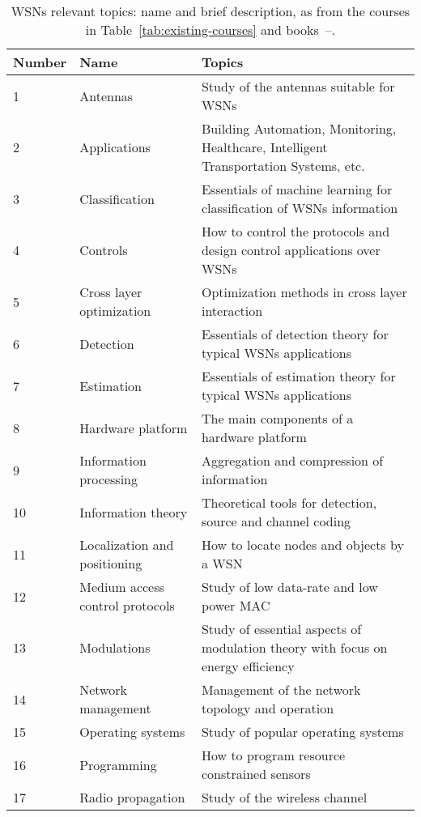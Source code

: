 \documentclass[onecolumn,12pt,draftclsnofoot,a4paper,peerreview]{IEEEtran}
\begin{document}
\begin{table}[t]
\tiny
\begin{center}
\caption{WSNs relevant topics: name and brief description, as from the courses in Table~\ref{tab:existing-courses} and books~\cite{ZhaoGuibas04}--\cite{WagnerWattenhofer10}.}
  \begin{tabular}{||  l || l  || l  ||  }
   \hline Number & Name & Topics \\
   \hline
    \hline 1 & Antennas & Study of the antennas suitable for WSNs \\
    \hline 2 & Applications  &  Building Automation, Monitoring, Healthcare, Intelligent Transportation Systems, etc. \\
    \hline 3 & Classification & Essentials of machine learning for classification of WSNs information \\
    \hline 4 & Controls  & How to control the protocols and design control applications over WSNs\\
    \hline 5 & Cross layer optimization & Optimization methods in cross layer interaction \\
    \hline 6 & Detection  & Essentials of detection theory for typical WSNs applications \\
    \hline 7 & Estimation  & Essentials of estimation theory for typical WSNs applications \\
    \hline 8 & Hardware platform  & The main components of a hardware platform \\
    \hline 9 & Information processing  & Aggregation and compression of information \\
    \hline 10 & Information theory  & Theoretical tools for detection, source and channel coding \\
    \hline 11 & Localization and positioning & How to locate nodes and objects by a WSN \\
    \hline 12 & Medium access control protocols  & Study of low data-rate and low power MAC \\
    \hline 13 & Modulations  & Study of essential aspects of modulation theory with focus on energy efficiency \\
    \hline 14 & Network management  & Management of the network topology and operation \\
    \hline 15 & Operating systems  & Study of popular operating systems \\
    \hline 16 & Programming  & How to program resource constrained sensors \\
    \hline 17 & Radio propagation  & Study of the wireless channel \\

\end{tabular}
\end{center}
\end{table}
\end{document}
